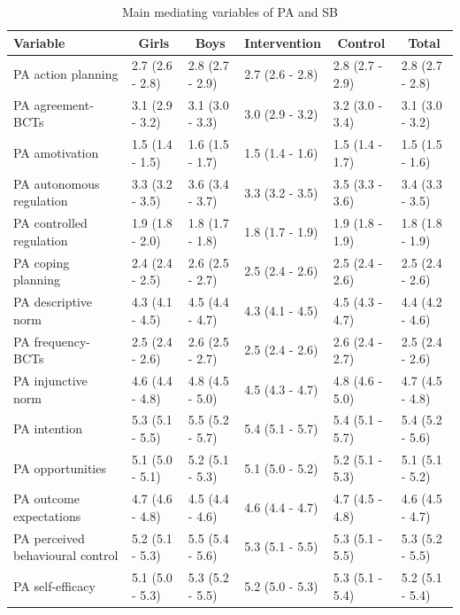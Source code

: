 \documentclass[english,floatsintext,]{apa6}
\theoremstyle{definition}
\theoremstyle{definition}
\theoremstyle{definition}
\theoremstyle{remark}
\begin{document}
\begin{table}[tbp]
\begin{center}
\begin{threeparttable}
\caption{\label{tab:mediator-table}Main mediating variables of PA and SB}
\begin{tabular}{llllll}
\toprule
Variable & \multicolumn{1}{c}{Girls} & \multicolumn{1}{c}{Boys} & \multicolumn{1}{c}{Intervention} & \multicolumn{1}{c}{Control} & \multicolumn{1}{c}{Total}\\
\midrule
PA action planning & 2.7 (2.6 - 2.8) & 2.8 (2.7 - 2.9) & 2.7 (2.6 - 2.8) & 2.8 (2.7 - 2.9) & 2.8 (2.7 - 2.8)\\
PA agreement-BCTs & 3.1 (2.9 - 3.2) & 3.1 (3.0 - 3.3) & 3.0 (2.9 - 3.2) & 3.2 (3.0 - 3.4) & 3.1 (3.0 - 3.2)\\
PA amotivation & 1.5 (1.4 - 1.5) & 1.6 (1.5 - 1.7) & 1.5 (1.4 - 1.6) & 1.5 (1.4 - 1.7) & 1.5 (1.5 - 1.6)\\
PA autonomous regulation & 3.3 (3.2 - 3.5) & 3.6 (3.4 - 3.7) & 3.3 (3.2 - 3.5) & 3.5 (3.3 - 3.6) & 3.4 (3.3 - 3.5)\\
PA controlled regulation & 1.9 (1.8 - 2.0) & 1.8 (1.7 - 1.8) & 1.8 (1.7 - 1.9) & 1.9 (1.8 - 1.9) & 1.8 (1.8 - 1.9)\\
PA coping planning & 2.4 (2.4 - 2.5) & 2.6 (2.5 - 2.7) & 2.5 (2.4 - 2.6) & 2.5 (2.4 - 2.6) & 2.5 (2.4 - 2.6)\\
PA descriptive norm & 4.3 (4.1 - 4.5) & 4.5 (4.4 - 4.7) & 4.3 (4.1 - 4.5) & 4.5 (4.3 - 4.7) & 4.4 (4.2 - 4.6)\\
PA frequency-BCTs & 2.5 (2.4 - 2.6) & 2.6 (2.5 - 2.7) & 2.5 (2.4 - 2.6) & 2.6 (2.4 - 2.7) & 2.5 (2.4 - 2.6)\\
PA injunctive norm & 4.6 (4.4 - 4.8) & 4.8 (4.5 - 5.0) & 4.5 (4.3 - 4.7) & 4.8 (4.6 - 5.0) & 4.7 (4.5 - 4.8)\\
PA intention & 5.3 (5.1 - 5.5) & 5.5 (5.2 - 5.7) & 5.4 (5.1 - 5.7) & 5.4 (5.1 - 5.7) & 5.4 (5.2 - 5.6)\\
PA opportunities & 5.1 (5.0 - 5.1) & 5.2 (5.1 - 5.3) & 5.1 (5.0 - 5.2) & 5.2 (5.1 - 5.3) & 5.1 (5.1 - 5.2)\\
PA outcome expectations & 4.7 (4.6 - 4.8) & 4.5 (4.4 - 4.6) & 4.6 (4.4 - 4.7) & 4.7 (4.5 - 4.8) & 4.6 (4.5 - 4.7)\\
PA perceived behavioural control & 5.2 (5.1 - 5.3) & 5.5 (5.4 - 5.6) & 5.3 (5.1 - 5.5) & 5.3 (5.1 - 5.5) & 5.3 (5.2 - 5.5)\\
PA self-efficacy & 5.1 (5.0 - 5.3) & 5.3 (5.2 - 5.5) & 5.2 (5.0 - 5.3) & 5.3 (5.1 - 5.4) & 5.2 (5.1 - 5.4)\\

\end{tabular}
\end{threeparttable}
\end{center}
\end{table}
\end{document}
